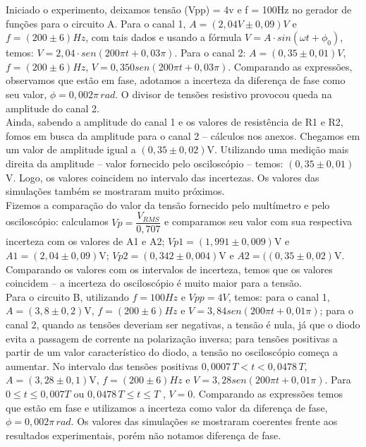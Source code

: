 \documentclass[a4paper, 11pt]{article}
\begin{document}
Iniciado o experimento, deixamos tensão (Vpp) = 4v e f = 100Hz no gerador de funções para o circuito A. 
Para o canal 1, $A = (2,04V \pm 0,09)V$  e $f = (200 \pm 6)Hz$, com tais dados e usando a fórmula $V = A \cdot sin(\omega t + \phi_{0})$, temos: $V = 2,04 \cdot sen(200\pi t + 0,03\pi)$. 
Para o canal 2: $A = (0,35 \pm 0,01)V$, $f = (200 \pm 6)Hz$, $V = 0,350sen(200\pi t + 0,03\pi)$. 
Comparando as expressões, observamos que estão em fase, adotamos a incerteza da diferença de fase como seu valor, $\phi = 0,002 \pi \, rad$. 
O divisor de tensões resistivo provocou queda na amplitude do canal 2. \\

Ainda, sabendo a amplitude do canal 1 e os valores de resistência de R1 e R2, fomos em busca da amplitude para o canal 2 – cálculos nos anexos. 
Chegamos em um valor de amplitude igual a $(0,35 \pm 0,02)$V. 
Utilizando uma medição mais direita da amplitude – valor fornecido pelo osciloscópio – temos: $(0,35 \pm 0,01)$V. 
Logo, os valores coincidem no intervalo das incertezas. Os valores das simulações também se mostraram muito próximos.\\

Fizemos a comparação do valor da tensão fornecido pelo multímetro e pelo osciloscópio: calculamos $Vp = \dfrac{ V_{RMS} }{0,707}$  e comparamos seu valor com sua respectiva incerteza com os valores de A1 e A2; $Vp1 = (1,991 \pm 0,009)$V e $A1 = (2,04 \pm 0,09)$V; $Vp2 = (0,342 \pm 0,004)$V e $A2 = ((0,35 \pm 0,02)$V. 
Comparando os valores com os intervalos de incerteza, temos que os valores coincidem – a incerteza do osciloscópio é muito maior para a tensão.\\

Para o circuito B, utilizando $f = 100Hz$ e $Vpp = 4V$, temos: para o canal 1, $A = (3,8 \pm 0,2)$V, $f = (200 \pm 6)Hz$ e $V = 3,84sen(200 \pi t + 0,01 \pi)$; para o canal 2, quando as tensões deveriam ser negativas, a tensão é nula, já que o diodo evita a passagem de corrente na polarização inversa; para tensões positivas a partir de um valor característico do diodo, a tensão no osciloscópio começa a aumentar. 
No intervalo das tensões positivas $0,0007 \, T < t < 0,0478 \, T$, $A = (3,28 \pm 0,1)$V, $f = (200 \pm 6)Hz$ e $V = 3,28sen(200 \pi t + 0,01 \pi)$. Para $0 \leq t \leq 0,007T$ ou $0,0478 \, T \leq t \leq T$ , $V= 0$. 
Comparando as expressões temos que estão em fase e utilizamos a incerteza como valor da diferença de fase, $\phi = 0,002 \pi \, rad$. 
Os valores das simulações se mostraram coerentes frente aos resultados experimentais, porém não notamos diferença de fase.\\
\end{document}
